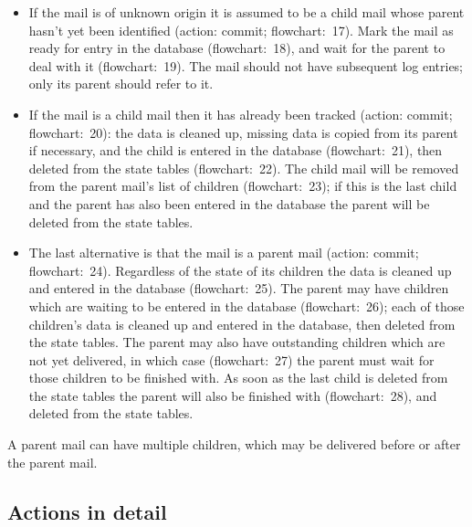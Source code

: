 \documentclass[a4paper,12pt,draft]{article}
\begin{document}
\begin{itemize}

    \item If the mail is of unknown origin it is assumed to be a child mail
        whose parent hasn't yet been identified (action: commit;
        flowchart:~17).  Mark the mail as ready for entry in the database
        (flowchart:~18), and wait for the parent to deal with it
        (flowchart:~19).  The mail should not have subsequent log entries;
        only its parent should refer to it.

    \item If the mail is a child mail then it has already been tracked
        (action: commit; flowchart:~20): the data is cleaned up, missing
        data is copied from its parent if necessary, and the child is
        entered in the database (flowchart:~21), then deleted from the
        state tables (flowchart:~22).  The child mail will be removed from
        the parent mail's list of children (flowchart:~23); if this is the
        last child and the parent has also been entered in the database the
        parent will be deleted from the state tables.

    \item The last alternative is that the mail is a parent mail (action:
        commit; flowchart:~24).  Regardless of the state of its children
        the data is cleaned up and entered in the database (flowchart:~25).
        The parent may have children which are waiting to be entered in the
        database (flowchart:~26); each of those children's data is cleaned
        up and entered in the database, then deleted from the state tables.
        The parent may also have outstanding children which are not yet
        delivered, in which case (flowchart:~27) the parent must wait for
        those children to be finished with.  As soon as the last child is
        deleted from the state tables the parent will also be finished with
        (flowchart:~28), and deleted from the state tables.

\end{itemize}

A parent mail can have multiple children, which may be delivered before or
after the parent mail.  

\subsection{Actions in detail}

\label{actions-in-detail}
\end{document}
